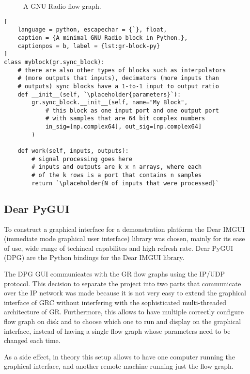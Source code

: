 \begin{figure}
	\caption{
		A GNU Radio flow graph.
		\label{fig:flowgraph}
	}
\end{figure}

{\newcommand{\placeholder}[1]{\textit{\(\langle\)\,\textrm{#1}\,\(\rangle\)}}
\begin{lstlisting}[
	language = python, escapechar = {`}, float,
	caption = {A minimal GNU Radio block in Python.},
	captionpos = b, label = {lst:gr-block-py}
]
class myblock(gr.sync_block):
	# there are also other types of blocks such as interpolators 
	# (more outputs that inputs), decimators (more inputs than 
	# outputs) sync blocks have a 1-to-1 input to output ratio
	def __init__(self, `\placeholder{parameters}`):
		gr.sync_block.__init__(self, name="My Block",
			# this block as one input port and one output port
			# with samples that are 64 bit complex numbers
			in_sig=[np.complex64], out_sig=[np.complex64]
		)

	def work(self, inputs, outputs):
		# signal processing goes here
		# inputs and outputs are k x n arrays, where each
		# of the k rows is a port that contains n samples
		return `\placeholder{N of inputs that were processed}`
\end{lstlisting}}

\subsection{Dear PyGUI}\label{sec:GUI}

To construct a graphical interface for a demonstration platform the Dear IMGUI (immediate mode graphical user interface) library was chosen, mainly for its ease of use, wide range of techincal capabilites and high refresh rate. Dear PyGUI (DPG) are the Python bindings for the Dear IMGUI library.

The DPG GUI communicates with the GR flow graphs using the IP/UDP protocol. This decision to separate the project into two parts that communicate over the IP network was made because it is not very easy to extend the graphical interface of GRC without interfering with the sophisticated multi-threaded architecture of GR. Furthermore, this allows to have multiple correctly configure flow graph on disk and to choose which one to run and display on the graphical interface, instead of having a single flow graph whose parameters need to be changed each time.

As a side effect, in theory this setup allows to have one computer running the graphical interface, and another remote machine running just the flow graph.

